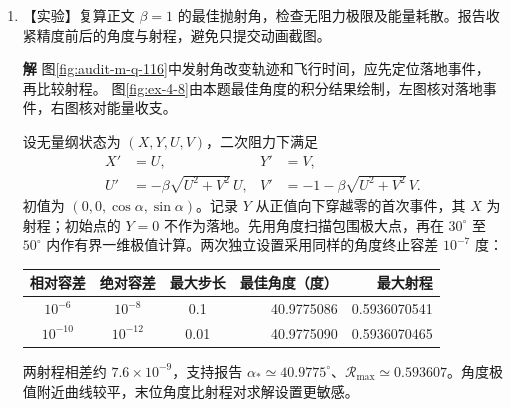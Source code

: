 \documentclass[11pt,openany,fontset=fandol]{ctexbook}
\theoremstyle{plain}\newtheorem{theorem}{定理}[chapter]\newtheorem{proposition}[theorem]{命题}
\theoremstyle{definition}\newtheorem{definition}{定义}[chapter]\newtheorem{example}{例}[chapter]
\theoremstyle{remark}\newtheorem*{remark}{说明}
\newcommand{\SolutionStart}{\par\nobreak\medskip\nobreak\noindent\textbf{解}\quad\ignorespaces}
\newenvironment{solution}{\SolutionStart}{\par\medskip}
\begin{document}
\begin{enumerate}[label=4.\arabic*,itemsep=3pt]
\begin{solution}
界线右侧的包络上界不超过初始位移的一半。在弱耦合首阶平均近似下，纵坐标的平方给出最大能量转移比例。
\end{solution}

\item \begin{minipage}[t]{\linewidth}
【实验】复算正文 $\beta=1$ 的最佳抛射角，检查无阻力极限及能量耗散。报告收紧精度前后的角度与射程，避免只提交动画截图。

\end{minipage}

\begin{solution}
图\ref{fig:audit-m-q-116}中发射角改变轨迹和飞行时间，应先定位落地事件，再比较射程。
图\ref{fig:ex-4-8}由本题最佳角度的积分结果绘制，左图核对落地事件，右图核对能量收支。

设无量纲状态为 $(X,Y,U,V)$，二次阻力下满足
\begin{align*}
X'&=U,&Y'&=V,\\
U'&=-\beta\sqrt{U^2+V^2}\,U,&
V'&=-1-\beta\sqrt{U^2+V^2}\,V.
\end{align*}
初值为 $(0,0,\cos\alpha,\sin\alpha)$。记录 $Y$ 从正值向下穿越零的首次事件，其 $X$ 为射程；初始点的 $Y=0$ 不作为落地。先用角度扫描包围极大点，再在 $30^\circ$ 至 $50^\circ$ 内作有界一维极值计算。两次独立设置采用同样的角度终止容差 $10^{-7}$ 度：
\begin{center}\small
\begin{tabular}{@{}c c c r r@{}}\toprule
相对容差&绝对容差&最大步长&最佳角度（度）&最大射程\\\midrule
$10^{-6}$&$10^{-8}$&0.1&40.9775086&0.5936070541\\
$10^{-10}$&$10^{-12}$&0.01&40.9775090&0.5936070465\\\bottomrule
\end{tabular}
\end{center}
两射程相差约 $7.6\times10^{-9}$，支持报告 $\alpha_*\simeq40.9775^\circ$、$\mathcal R_{\max}\simeq0.593607$。角度极值附近曲线较平，末位角度比射程对求解设置更敏感。


\end{solution}
\end{enumerate}
\end{document}
